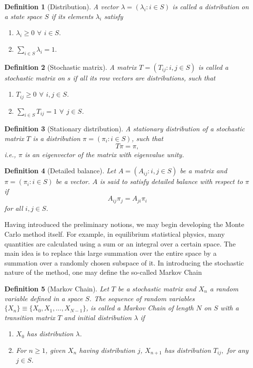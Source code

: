 \documentclass[]{article}
\numberwithin{equation}{section}
\theoremstyle{break}
\newtheorem*{definition}{Definition}
\newcommand{\bk}{\par\null\par\noindent}
\begin{document}
\begin{definition}[Distribution]
A vector $\lambda = (\lambda_i: i\in S)$ is called a distribution on a state space $S$ if its elements $\lambda_i$ satisfy
\begin{enumerate}
    \item $\lambda_i \geq 0$ $\forall$ $i\in S.$
    \item $\sum_{i\in S} \lambda_i = 1.$
\end{enumerate}
\end{definition}
\begin{definition}[Stochastic matrix]
A matrix $T = (T_{ij}: i,j \in S)$ is called a stochastic matrix on $s$ if all its row vectors are distributions, such that
\begin{enumerate}
    \item $T_{ij} \geq 0$ $\forall$ $i,j \in S$.
    \item $\sum_{i\in S} T_{ij} = 1$ $\forall$ $j\in S$.
\end{enumerate}
\end{definition}
\begin{definition}[Stationary distribution]
A stationary distribution of a stochastic matrix $T$ is a distribution $\pi = (\pi_i : i \in S)$, such that
\[T \pi = \pi,\]
i.e., $\pi$ is an eigenvector of the matrix with eigenvalue unity.
\end{definition}
\begin{definition}[Detailed balance]
Let $A = (A_{ij}: i,j\in S)$ be a matrix and $\pi = (\pi_{i} : i\in S)$ be a vector. $A$ is said to satisfy detailed balance with respect to $\pi$ if
\[A_{ij}\pi_j = A_{ji}\pi_i\]
for all $i,j \in S$.
\end{definition}
\bk
Having introduced the preliminary notions, we may begin developing the Monte Carlo method itself. For example, in equilibrium statistical physics, many quantities are calculated using a sum or an integral over a certain space. The main idea is to replace this large summation over the entire space by a summation over a randomly chosen subspace of it. In introducing the stochastic nature of the method, one may define the so-called Markov Chain
\begin{definition}[Markov Chain]
Let $T$ be a stochastic matrix and $X_n$ a random variable defined in a space $S$. The sequence of random variables $\{X_n\}\equiv\{X_0, X_1, \dots, X_{N-1}\}$, is called a Markov Chain of length $N$ on $S$ with a transition matrix $T$ and initial distribution $\lambda$ if
\begin{enumerate}
    \item $X_0$ has distribution $\lambda$.
    \item For $n\geq 1$, given $X_n$ having distribution $j$, $X_{n+1}$ has distribution $T_{ij}, $ for any $j\in S$.
\end{enumerate}
\end{definition}
\end{document}
